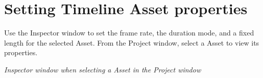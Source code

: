 \chapter{Setting Timeline Asset properties}
\hypertarget{md__library_2_package_cache_2com_8unity_8timeline_0d1_87_86_2_documentation_0i_2insp__tl}{}\label{md__library_2_package_cache_2com_8unity_8timeline_0d1_87_86_2_documentation_0i_2insp__tl}
\label{md__library_2_package_cache_2com_8unity_8timeline_0d1_87_86_2_documentation_0i_2insp__tl_autotoc_md1181}%
%
 Use the Inspector window to set the frame rate, the duration mode, and a fixed length for the selected  Asset. From the Project window, select a  Asset to view its properties.



{\itshape Inspector window when selecting a  Asset in the Project window}

